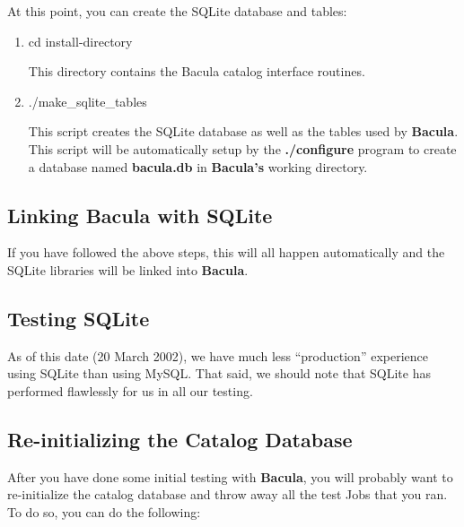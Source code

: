{{At this point, you can create the SQLite database and tables: 

\begin{enumerate}
\item cd \lt{}install-directory\gt{}

   This directory contains the Bacula catalog  interface routines.  

\item ./make\_sqlite\_tables

   This script creates the SQLite database as well as the  tables used by {\bf
Bacula}. This script will be  automatically setup by the {\bf ./configure}
program  to create a database named {\bf bacula.db} in {\bf Bacula's}  working
directory. 
\end{enumerate}

\subsection*{Linking Bacula with SQLite}

If you have followed the above steps, this will all happen automatically and
the SQLite libraries will be linked into {\bf Bacula}. 

\subsection*{Testing SQLite}

As of this date (20 March 2002), we have much less ``production'' experience
using SQLite than using MySQL. That said, we should note that SQLite has
performed flawlessly for us in all our testing. 

\subsection*{Re-initializing the Catalog Database}

After you have done some initial testing with {\bf Bacula}, you will probably
want to re-initialize the catalog database and throw away all the test Jobs
that you ran. To do so, you can do the following: 

}}
